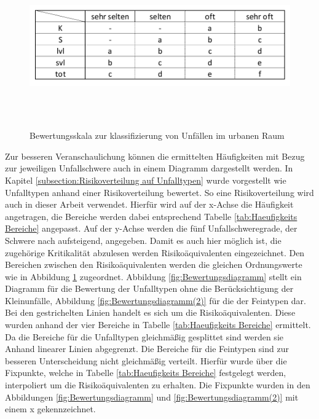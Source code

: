 \begin{savenotes}
	\begin{figure}[H]
		\centering
		\includegraphics[width=12cm,height=7cm]{figures/Bewertungsskala}
		\caption[Bewertungsskala zur klassifizierung von Unfällen im urbanen Raum]{Bewertungsskala zur klassifizierung von Unfällen im urbanen Raum}\label{fig:Bewertungsskala}
	\end{figure}
\end{savenotes}

Zur besseren Veranschaulichung können die ermittelten Häufigkeiten mit Bezug zur jeweiligen Unfallschwere auch in einem Diagramm dargestellt werden. In Kapitel \ref{subsection:Risikoverteilung auf Unfalltypen} wurde vorgestellt wie \Textcite[S. 60]{Gschwendtner.2015} Unfalltypen anhand einer Risikoverteilung bewertet. So eine Risikoverteilung wird auch in dieser Arbeit verwendet. Hierfür wird auf der x-Achse die Häufigkeit angetragen, die Bereiche werden dabei entsprechend Tabelle \ref{tab:Haeufigkeits Bereiche} angepasst. Auf der y-Achse werden die fünf Unfallschweregrade, der Schwere nach aufsteigend, angegeben. Damit es auch hier möglich ist, die zugehörige Kritikalität abzulesen werden Risikoäquivalenten eingezeichnet. Den Bereichen zwischen den Risikoäquivalenten werden die gleichen Ordnungswerte wie in Abbildung \ref{fig:Bewertungsskala} zugeordnet. Abbildung \ref{fig:Bewertungsdiagramm} stellt ein Diagramm für die Bewertung der Unfalltypen ohne die Berücksichtigung der Kleinunfälle, Abbildung \ref{fig:Bewertungsdiagramm(2)} für die der Feintypen dar. Bei den gestrichelten Linien handelt es sich um die Risikoäquivalenten. Diese wurden anhand der vier Bereiche in Tabelle \ref{tab:Haeufigkeits Bereiche} ermittelt. Da die Bereiche für die Unfalltypen gleichmäßig gesplittet sind werden sie Anhand linearer Linien abgegrenzt. Die Bereiche für die Feintypen sind zur besseren Unterscheidung nicht gleichmäßig verteilt. Hierfür wurde über die Fixpunkte, welche in Tabelle \ref{tab:Haeufigkeits Bereiche} festgelegt werden, interpoliert um die Risikoäquivalenten zu erhalten. Die Fixpunkte wurden in den Abbildungen \ref{fig:Bewertungsdiagramm} und \ref{fig:Bewertungsdiagramm(2)} mit einem x gekennzeichnet. 

